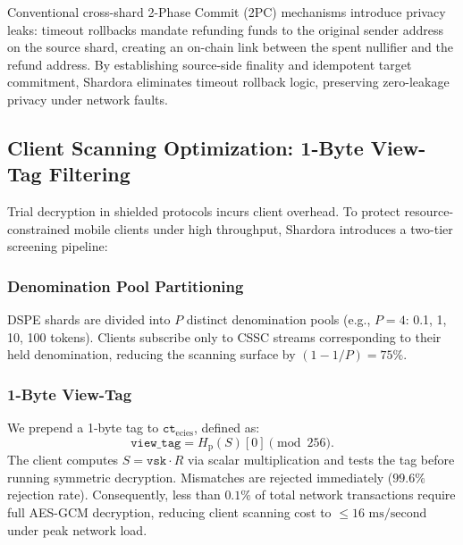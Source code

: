 \documentclass[journal,10pt,twocolumn]{IEEEtran}
\theoremstyle{definition}
\theoremstyle{remark}
\begin{document}
Conventional cross-shard 2-Phase Commit (2PC) mechanisms introduce privacy leaks: timeout rollbacks mandate refunding funds to the original sender address on the source shard, creating an on-chain link between the spent nullifier and the refund address. By establishing source-side finality and idempotent target commitment, Shardora eliminates timeout rollback logic, preserving zero-leakage privacy under network faults.

\subsection{Client Scanning Optimization: 1-Byte View-Tag Filtering}
Trial decryption in shielded protocols incurs client overhead. To protect resource-constrained mobile clients under high throughput, Shardora introduces a two-tier screening pipeline:

\subsubsection{Denomination Pool Partitioning}
DSPE shards are divided into $P$ distinct denomination pools (e.g., $P=4$: 0.1, 1, 10, 100 tokens). Clients subscribe only to CSSC streams corresponding to their held denomination, reducing the scanning surface by $(1 - 1/P) = 75\%$.

\subsubsection{1-Byte View-Tag}
We prepend a 1-byte tag to $\mathtt{ct}_{\text{ecies}}$, defined as:
\begin{equation}
\mathtt{view\_tag} = H_{\text{p}}(S)[0] \pmod{256}.
\end{equation}
The client computes $S = \mathtt{vsk} \cdot R$ via scalar multiplication and tests the tag before running symmetric decryption. Mismatches are rejected immediately ($99.6\%$ rejection rate). Consequently, less than $0.1\%$ of total network transactions require full AES-GCM decryption, reducing client scanning cost to $\le 16\text{ ms/second}$ under peak network load.
\end{document}
